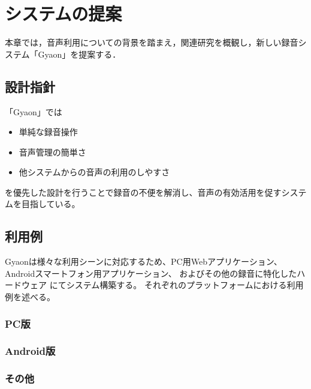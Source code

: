 \chapter{システムの提案}
\label{chap:proposal}

本章では，音声利用についての背景を踏まえ，関連研究を概観し，新しい録音システム「Gyaon」を提案する．

\newpage

\section{設計指針}

「Gyaon」では
\begin{itemize}
\item 単純な録音操作
\item 音声管理の簡単さ
\item 他システムからの音声の利用のしやすさ
\end{itemize}
を優先した設計を行うことで録音の不便を解消し、音声の有効活用を促すシステムを目指している。

\section{利用例}
Gyaonは様々な利用シーンに対応するため、PC用Webアプリケーション、
Androidスマートフォン用アプリケーション、
およびその他の録音に特化したハードウェア
にてシステム構築する。
それぞれのプラットフォームにおける利用例を述べる。

\subsection{PC版}

%
%
%
%
%
%


\subsection{Android版}
\subsection{その他}
